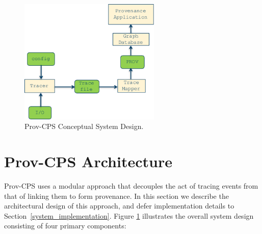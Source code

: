 %
%
%
%
%
%
%
%
% 
%

\begin{figure}[h!]
\begin{center}
\includegraphics[width=0.6\textwidth]{sys_arc_3_6.pdf}
\end{center}
\caption{Prov-CPS Conceptual System Design.}
\label{framework_design}
\end{figure}

\section{Prov-CPS Architecture}
Prov-CPS uses a modular approach that decouples the act of tracing events from that of linking them to form provenance. In this section we describe the architectural design of this approach, and defer implementation details to Section~\ref{system_implementation}.  Figure \ref{framework_design} illustrates the overall system design consisting of four primary components:

